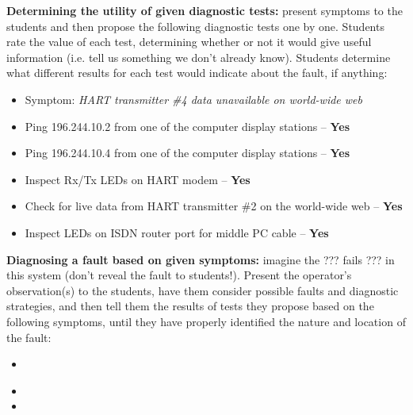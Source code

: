 \vskip 10pt


\noindent
{\bf Determining the utility of given diagnostic tests:} present symptoms to the students and then propose the following diagnostic tests one by one.  Students rate the value of each test, determining whether or not it would give useful information (i.e. tell us something we don't already know).  Students determine what different results for each test would indicate about the fault, if anything:

\begin{itemize}
\item{} Symptom: {\it HART transmitter \#4 data unavailable on world-wide web}
\item{} Ping 196.244.10.2 from one of the computer display stations -- {\bf Yes}
\item{} Ping 196.244.10.4 from one of the computer display stations -- {\bf Yes}
\item{} Inspect Rx/Tx LEDs on HART modem -- {\bf Yes}
\item{} Check for live data from HART transmitter \#2 on the world-wide web -- {\bf Yes}
\item{} Inspect LEDs on ISDN router port for middle PC cable -- {\bf Yes}
\end{itemize}


\vskip 10pt


\noindent
{\bf Diagnosing a fault based on given symptoms:} imagine the ??? fails ??? in this system (don't reveal the fault to students!).  Present the operator's observation(s) to the students, have them consider possible faults and diagnostic strategies, and then tell them the results of tests they propose based on the following symptoms, until they have properly identified the nature and location of the fault:

\begin{itemize}
\item{} {\it }
\item{} 
\item{} 
\end{itemize}



